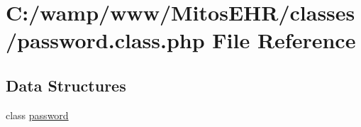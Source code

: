 \hypertarget{password_8class_8php}{\section{\-C\-:/wamp/www/\-Mitos\-E\-H\-R/classes/password.class.\-php \-File \-Reference}
\label{password_8class_8php}
}
\subsection*{\-Data \-Structures}
\begin{DoxyCompactItemize}
\item 
class \hyperlink{classpassword}{password}
\end{DoxyCompactItemize}

